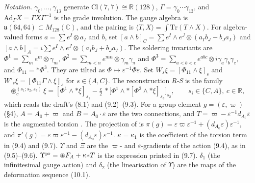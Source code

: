 \documentclass[11pt]{article}
\theoremstyle{remark}
\begin{document}
\emph{Notation.} $\gamma_0,\dots,\gamma_{13}$ generate $\mathrm{Cl}(7,7)\cong\mathbb R(128)$, $\Gamma=\gamma_0\cdots\gamma_{13}$, and $\mathrm{Ad}_\Gamma X=\Gamma X\Gamma^{-1}$ is the grade involution. The gauge algebra is $\mathfrak u(64,64)\subset M_{128}(\mathbb C)$, and the pairing is $\langle T,X\rangle=\int\mathrm{Tr}(T\wedge X)$. For algebra-valued forms $a=\sum e^I\otimes a_I$ and $b$, set $[a\wedge b]_C=\sum e^I\wedge e^J\otimes(a_Ib_J-b_Ja_I)$ and $[a\wedge b]_A=i\sum e^I\wedge e^J\otimes(a_Ib_J+b_Ja_I)$. The soldering invariants are $\Phi^1=\sum_m e^m\otimes\gamma_m$, $\Phi^2=\sum_{m<n}e^{mn}\otimes\gamma_m\gamma_n$ and $\Phi^3=\sum_{a<b<c}e^{abc}\otimes i\gamma_a\gamma_b\gamma_c$, and $\Phi_{11}={*}\Phi^3$. They are tilted as $\Phi\mapsto\varepsilon^{-1}\Phi\varepsilon$. Set $W_s\xi=[\Phi_{11}\wedge\xi]_s$ and $W'_s\xi=[\Phi_{11}\Gamma\wedge\xi]_s$ for $s\in\{A,C\}$. The reconstruction \emph{R-S} is the family
\[ \circledast^{(s_1;s_2,s_3)}_c\xi=[\Phi^1\wedge{*}\xi]_{s_1}-\tfrac c2\,{*}\bigl[\Phi^1\wedge{*}[\Phi^2\wedge{*}\xi]_{s_3}\bigr]_{s_2},\qquad s_i\in\{C,A\},\ c\in\mathbb R, \]
which reads the draft's (8.1) and (9.2)--(9.3). For a group element $g=(\varepsilon,\varpi)$ (\S4), $A=A_0+\varpi$ and $B=A_0\cdot\varepsilon$ are the two connections, and $T=\varpi-\varepsilon^{-1}d_{A_0}\varepsilon$ is the augmented torsion \cite[(7.3)]{W21}. The projection of \cite[(6.11)]{W21} is $\pi(g)=\varepsilon\varpi\varepsilon^{-1}+(d_{A_0}\varepsilon)\varepsilon^{-1}$, and $\pi'(g)=\varepsilon\varpi\varepsilon^{-1}-(d_{A_0}\varepsilon)\varepsilon^{-1}$. $\kappa=\kappa_1$ is the coefficient of the torsion term in (9.4) and (9.7). $\Upsilon$ and $\Xi$ are the $\varpi$- and $\varepsilon$-gradients of the action (9.4), as in (9.5)--(9.6). $\Upsilon^{\rm pr}=\circledast F_A+\kappa{*}T$ is the expression printed in (9.7). $\delta_1$ (the infinitesimal gauge action) and $\delta_2$ (the linearisation of $\Upsilon$) are the maps of the deformation sequence (10.1).
\end{document}
